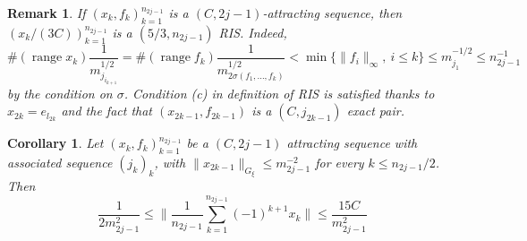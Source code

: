 \documentclass[a4paper]{amsart}
\theoremstyle{plain}
\newtheorem{corollary}[theorem]{Corollary}
\newtheorem{remark}[theorem]{Remark}
\newcommand{\norm}[1][\cdot]{\lVert #1\rVert}
\DeclareMathOperator{\ran}{range}
\begin{document}
\begin{remark} If $(x_k,f_k)_{k=1}^{n_{2j-1}}$ is a $(C,2j-1)$-attracting
sequence, then $(x_k/(3C))_{k=1}^{n_{2j-1}}$ is a $(5/3, n_{2j-1})$ RIS. Indeed,
$$\# (\ran x_k)\frac{1}{m^{1/2}_{j_{i_{k+1}}}}=\# (\ran
f_k)\frac{1}{m^{1/2}_{2\sigma(f_1,\dots,f_k)}}<\min \{
\norm[f_i]_\infty,\ i\leq k\}\leq m_{j_1}^{-1/2}\leq n^{-1}_{2j-1}
$$
by the condition on $\sigma$. Condition (c) in definition of RIS is satisfied thanks
to $x_{2k}=e_{l_{2k}}$ and the fact that $(x_{2k-1},f_{2k-1})$ is a $(C,j_{2k-1})$ exact pair.
\end{remark}
\begin{corollary}\label{depest}
Let  $(x_k,f_k)_{k=1}^{n_{2j-1}}$ be a $(C,2j-1)$ attracting sequence with associated
sequence $(j_k)_{k}$, with $\norm[x_{2k-1}]_{G_{\xi}}\leq m_{2j-1}^{-2}$ for every $k\leq
n_{2j-1}/2$. Then
\begin{equation}\label{qq2} \frac{1}{2m_{2j-1}^{2}}\leq \|\frac{1}{n_{2j-1}}\sum\limits_{k=1}^{n_{2j-1}}
  (-1)^{k+1}x_k\| \leq \frac{15C}{m_{2j-1}^2}
\end{equation}
\end{corollary}
\end{document}
